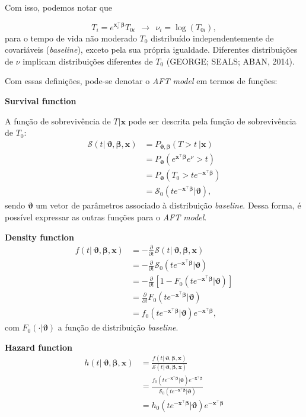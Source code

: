 \documentclass[
]{article}
\begin{document}
Com isso, podemos notar que

\[
T_i = e^{\mathbf{x}_i^{\top}\pmb{\beta}}T_{0i} \ \ \rightarrow \ \ \nu_i = \log(T_{0i}),
\] para o tempo de vida não moderado \(T_0\) distribuído
independentemente de covariáveis (\emph{baseline}), exceto pela sua
própria igualdade. Diferentes distribuições de \(\nu\) implicam
distribuições diferentes de \(T_0\) (GEORGE; SEALS; ABAN, 2014).

Com essas definições, pode-se denotar o \emph{AFT model} em termos de
funções:

\textbf{Survival function}

A função de sobrevivência de \(T|\mathbf{x}\) pode ser descrita pela
função de sobrevivência de \(T_0\): \[
\begin{align*} 
\mathcal{S}(t| \ \pmb{\vartheta}, \pmb{\beta}, \mathbf{x}) & = P_{\pmb{\vartheta}, \pmb{\beta}}(T > t \ |\mathbf{x}) \\
& = P_{\pmb{\vartheta}}\left(e^{\mathbf{x}^{\top}\pmb{\beta}}e^{\nu} > t \right) \\
& = P_{\pmb{\vartheta}}\left(T_0 > te^{-\mathbf{x}^{\top}\pmb{\beta}} \right) \\
& = \mathcal{S}_0\left(te^{-\mathbf{x}^{\top}\pmb{\beta}}\Big|\pmb{\vartheta} \right),
\end{align*}
\] sendo \(\pmb{\vartheta}\) um vetor de parâmetros associado à
distribuição \emph{baseline}. Dessa forma, é possível expressar as
outras funções para o \emph{AFT model}.

\textbf{Density function} \[
\begin{align*} 
f(t| \ \pmb{\vartheta}, \pmb{\beta}, \mathbf{x}) & = -\frac{\partial}{\partial t}\mathcal{S}(t| \ \pmb{\vartheta}, \pmb{\beta}, \mathbf{x}) \\
& = -\frac{\partial}{\partial t}\mathcal{S}_0\left(te^{-\mathbf{x}^{\top}\pmb{\beta}}\Big|\pmb{\vartheta} \right) \\
& = -\frac{\partial}{\partial t}\left[1-F_0\left(te^{-\mathbf{x}^{\top}\pmb{\beta}}\Big|\pmb{\vartheta} \right) \right] \\
& = \frac{\partial}{\partial t}F_0\left(te^{-\mathbf{x}^{\top}\pmb{\beta}}\Big|\pmb{\vartheta} \right) \\
& = f_0\left(te^{-\mathbf{x}^{\top}\pmb{\beta}}\Big|\pmb{\vartheta} \right)e^{-\mathbf{x}^{\top}\pmb{\beta}},
\end{align*}
\] com \(F_0(\cdot|\pmb{\vartheta})\) a função de distribuição
\emph{baseline}.

\textbf{Hazard function} \[
\begin{align*} 
h(t| \ \pmb{\vartheta}, \pmb{\beta}, \mathbf{x}) & = \frac{f(t| \ \pmb{\vartheta}, \pmb{\beta}, \mathbf{x})}{\mathcal{S}(t| \ \pmb{\vartheta}, \pmb{\beta}, \mathbf{x})} \\
& = \frac{f_0\left(te^{-\mathbf{x}^{\top}\pmb{\beta}}\Big|\pmb{\vartheta} \right)e^{-\mathbf{x}^{\top}\pmb{\beta}}}{\mathcal{S}_0\left(te^{-\mathbf{x}^{\top}\pmb{\beta}}\Big|\pmb{\vartheta} \right)} \\
& = h_0\left(te^{-\mathbf{x}^{\top}\pmb{\beta}}\Big|\pmb{\vartheta} \right)e^{-\mathbf{x}^{\top}\pmb{\beta}}
\end{align*}
\]
\end{document}
